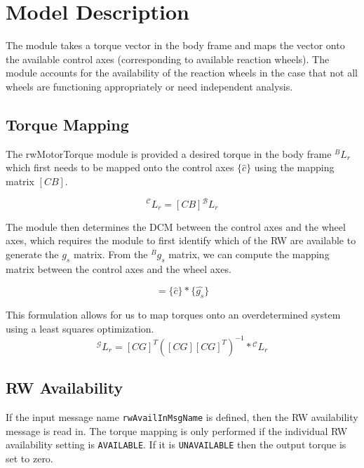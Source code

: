 \section{Model Description}
The module takes a torque vector in the body frame and maps the vector onto the available control axes (corresponding to available reaction wheels). The module accounts for the availability of the reaction wheels in the case that not all wheels are functioning appropriately or need independent analysis. 



\subsection{Torque Mapping}
The rwMotorTorque module is provided a desired torque in the body frame ${}^{B}L_r$ which first needs to be mapped onto the control axes $\lbrace \hat{c} \rbrace$ using the mapping matrix $[CB]$. 



\begin{equation}
{}^{\mathcal{C}}L_r = [CB]{}^{\mathcal{B}}L_r
\end{equation}

The module then determines the DCM between the control axes and the wheel axes, which requires the module to first identify which of the RW are available to generate the $g_s$ matrix. From the ${}^{B}g_s$ matrix, we can compute the mapping matrix between the control axes and the wheel axes.

\begin{equation}
[CG] = \lbrace  \hat{c} \rbrace*  \lbrace\hat{g_s} \rbrace
\end{equation}

This formulation allows for us to map torques onto an overdetermined system using a least squares optimization. 
\begin{equation}
 {}^{\mathcal{G}}L_r  = [CG]^T \left([CG][CG]^T\right)^{-1} * {}^{\mathcal{C}}L_r 
\end{equation}


\subsection{RW Availability} 
If the input message name {\tt rwAvailInMsgName} is defined, then the RW availability message is read in. The torque mapping is only performed if the individual RW availability setting is {\tt AVAILABLE}.  If it is {\tt UNAVAILABLE} then the output torque is set to zero.  

